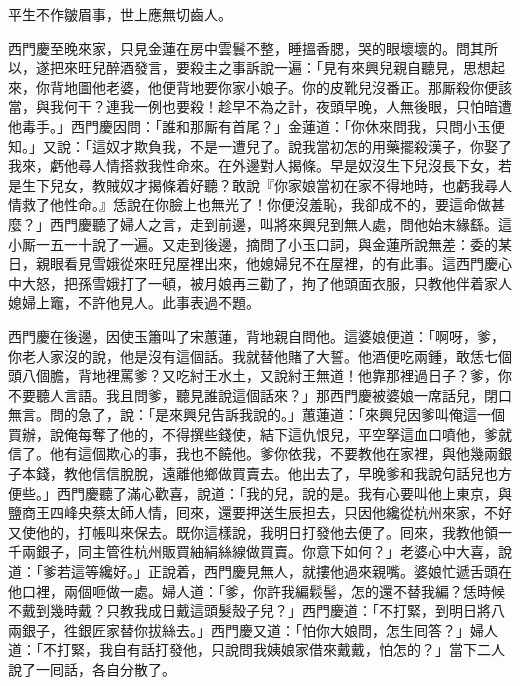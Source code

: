 \begin{myquote}
平生不作皺眉事，世上應無切齒人。
\end{myquote}

西門慶至晚來家，只見金蓮在房中雲鬟不整，睡搵香腮，哭的眼壞壞的。{}問其所以，遂把來旺兒醉酒發言，要殺主之事訴說一遍：「見有來興兒親自聽見，思想起來，你背地圖他老婆，他便背地要你家小娘子。你的皮靴兒沒番正。那厮殺你便該當，與我何干？連我一例也要殺！趁早不為之計，夜頭早晚，人無後眼，只怕暗遭他毒手。」西門慶因問：「誰和那厮有首尾？」金蓮道：「你休來問我，只問小玉便知。」又說：「這奴才欺負我，不是一遭兒了。說我當初怎的用藥擺殺漢子，你娶了我來，虧他尋人情搭救我性命來。在外邊對人揭條。早是奴沒生下兒沒長下女，若是生下兒女，教賊奴才揭條着好聽？{}敢說『你家娘當初在家不得地時，也虧我尋人情救了他性命。』恁說在你臉上也無光了！你便沒羞恥，我卻成不的，要這命做甚麼？」西門慶聽了婦人之言，走到前邊，叫將來興兒到無人處，問他始末緣繇。這小厮一五一十說了一遍。又走到後邊，摘問了小玉口詞，與金蓮所說無差：委的某日，親眼看見雪娥從來旺兒屋裡出來，他媳婦兒不在屋裡，的有此事。這西門慶心中大怒，把孫雪娥打了一頓，被月娘再三勸了，拘了他頭面衣服，只教他伴着家人媳婦上竈，不許他見人。此事表過不題。

西門慶在後邊，因使玉簫叫了宋蕙蓮，背地親自問他。{}這婆娘便道：「啊呀，爹，你老人家沒的說，他是沒有這個話。我就替他賭了大誓。他酒便吃兩鍾，敢恁七個頭八個膽，背地裡罵爹？又吃紂王水土，又說紂王無道！他靠那裡過日子？爹，你不要聽人言語。我且問爹，聽見誰說這個話來？」{}那西門慶被婆娘一席話兒，閉口無言。問的急了，說：「是來興兒告訴我說的。」蕙蓮道：「來興兒因爹叫俺這一個買辦，說俺每奪了他的，不得撰些錢使，結下這仇恨兒，平空拏這血口噴他，爹就信了。他有這個欺心的事，我也不饒他。爹你依我，不要教他在家裡，與他幾兩銀子本錢，教他信信脫脫，遠離他鄉做買賣去。{}他出去了，早晚爹和我說句話兒也方便些。」西門慶聽了滿心歡喜，說道：「我的兒，說的是。我有心要叫他上東京，與鹽商王四峰央蔡太師人情，囘來，還要押送生辰担去，只因他纔從杭州來家，不好又使他的，打帳叫來保去。既你這樣說，我明日打發他去便了。囘來，我教他領一千兩銀子，同主管徃杭州販買紬絹絲線做買賣。你意下如何？」老婆心中大喜，說道：「爹若這等纔好。」正說着，西門慶見無人，就摟他過來親嘴。婆娘忙遞舌頭在他口裡，兩個咂做一處。婦人道：「爹，你許我編鬏髻，怎的還不替我編？{}恁時候不戴到幾時戴？只教我成日戴這頭髮殼子兒？」西門慶道：「不打緊，到明日將八兩銀子，徃銀匠家替你拔絲去。」西門慶又道：「怕你大娘問，怎生囘答？」婦人道：「不打緊，我自有話打發他，只說問我姨娘家借來戴戴，怕怎的？」當下二人說了一囘話，各自分散了。

